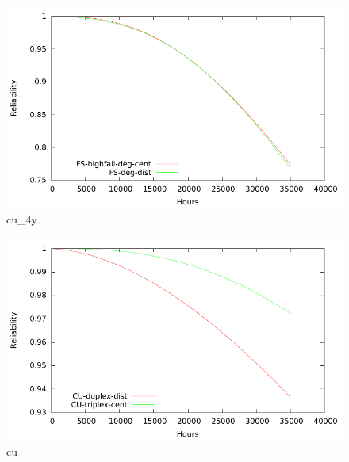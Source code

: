 \begin{figure}[H]
  \centering
  \includegraphics{plots/FS-hf.pdf}
  \caption{cu\_4y}
  \label{fig:cu_4y}
\end{figure}
\begin{figure}[H]
  \centering
  \includegraphics{plots/CUs.pdf}
  \caption{cu}
  \label{fig:cu}
\end{figure}